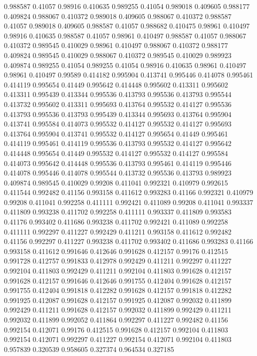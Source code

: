 0.988587 0.41057
0.98916 0.410635
0.989255 0.41054
0.989018 0.409605
0.988177 0.409824
0.988067 0.410372
0.989018 0.409605
0.988067 0.410372
0.988587 0.41057
0.989018 0.409605
0.988587 0.41057
0.988682 0.410475
0.98961 0.410497
0.98916 0.410635
0.988587 0.41057
0.98961 0.410497
0.988587 0.41057
0.988067 0.410372
0.989545 0.410029
0.98961 0.410497
0.988067 0.410372
0.988177 0.409824
0.989545 0.410029
0.988067 0.410372
0.989545 0.410029
0.989923 0.409874
0.989255 0.41054
0.989255 0.41054
0.98916 0.410635
0.98961 0.410497
0.98961 0.410497
0.99589 0.414182
0.995904 0.413741
0.995446 0.414078
0.995461 0.414119
0.995654 0.41449
0.995642 0.414448
0.995602 0.413311
0.995602 0.413311
0.995439 0.413344
0.995536 0.413793
0.995536 0.413793
0.995544 0.413732
0.995602 0.413311
0.995693 0.413764
0.995532 0.414127
0.995536 0.413793
0.995536 0.413793
0.995439 0.413344
0.995693 0.413764
0.995904 0.413741
0.995584 0.414073
0.995532 0.414127
0.995532 0.414127
0.995693 0.413764
0.995904 0.413741
0.995532 0.414127
0.995654 0.41449
0.995461 0.414119
0.995461 0.414119
0.995536 0.413793
0.995532 0.414127
0.995642 0.414448
0.995654 0.41449
0.995532 0.414127
0.995532 0.414127
0.995584 0.414073
0.995642 0.414448
0.995536 0.413793
0.995461 0.414119
0.995446 0.414078
0.995446 0.414078
0.995544 0.413732
0.995536 0.413793
0.989923 0.409874
0.989545 0.410029
0.99208 0.411041
0.992321 0.410979
0.992615 0.411544
0.992482 0.41156
0.993158 0.411612
0.993283 0.41166
0.992321 0.410979
0.99208 0.411041
0.992258 0.411111
0.992421 0.411089
0.99208 0.411041
0.993337 0.411809
0.993238 0.411702
0.992258 0.411111
0.993337 0.411809
0.993583 0.41176
0.993402 0.411686
0.993238 0.411702
0.992421 0.411089
0.992258 0.411111
0.992297 0.411227
0.992429 0.411211
0.993158 0.411612
0.992482 0.41156
0.992297 0.411227
0.993238 0.411702
0.993402 0.411686
0.993283 0.41166
0.993158 0.411612
0.991646 0.412646
0.991628 0.412157
0.99176 0.412515
0.991728 0.412757
0.991833 0.412978
0.992429 0.411211
0.992297 0.411227
0.992104 0.411803
0.992429 0.411211
0.992104 0.411803
0.991628 0.412157
0.991628 0.412157
0.991646 0.412646
0.991755 0.412404
0.991628 0.412157
0.991755 0.412404
0.991818 0.412282
0.991628 0.412157
0.991818 0.412282
0.991925 0.412087
0.991628 0.412157
0.991925 0.412087
0.992032 0.411899
0.992429 0.411211
0.991628 0.412157
0.992032 0.411899
0.992429 0.411211
0.992032 0.411899
0.992052 0.411864
0.992297 0.411227
0.992482 0.41156
0.992154 0.412071
0.99176 0.412515
0.991628 0.412157
0.992104 0.411803
0.992154 0.412071
0.992297 0.411227
0.992154 0.412071
0.992104 0.411803
0.957839 0.320539
0.958605 0.327374
0.964534 0.327185
